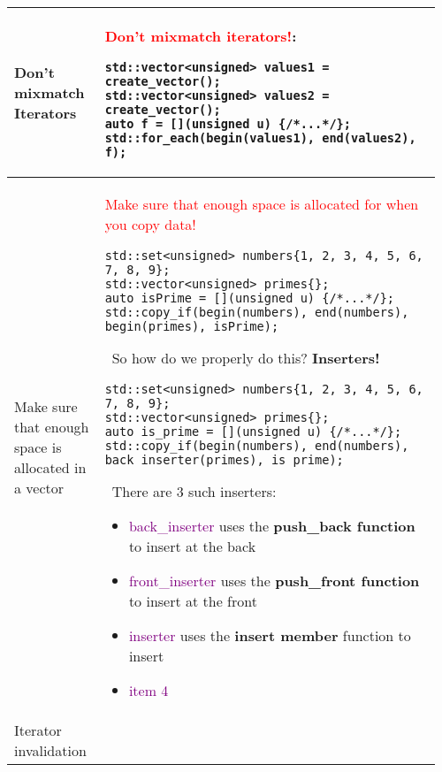 \documentclass[main.tex,fontsize=8pt,paper=a4,paper=portrait,DIV=calc,]{scrartcl}
\begin{document}
\begin{table}[ht!]
\begin{tabular}{|m{0.2\linewidth}|m{0.755\linewidth}|}
\hline
Don't mixmatch Iterators & 
\textcolor{red}{Don't mixmatch iterators!}:\newline
\begin{lstlisting}
std::vector<unsigned> values1 = create_vector();
std::vector<unsigned> values2 = create_vector();
auto f = [](unsigned u) {/*...*/};
std::for_each(begin(values1), end(values2), f);
\end{lstlisting}
\\
\hline
Make sure that enough space is allocated in a vector & 
\textcolor{red}{Make sure that enough space is allocated for when you copy data!}\newline
\begin{lstlisting}
std::set<unsigned> numbers{1, 2, 3, 4, 5, 6, 7, 8, 9};
std::vector<unsigned> primes{};
auto isPrime = [](unsigned u) {/*...*/};
std::copy_if(begin(numbers), end(numbers), begin(primes), isPrime);
\end{lstlisting}
\, \newline
So how do we properly do this? \textbf{Inserters!}\newline
\begin{lstlisting}
std::set<unsigned> numbers{1, 2, 3, 4, 5, 6, 7, 8, 9};
std::vector<unsigned> primes{};
auto is_prime = [](unsigned u) {/*...*/};
std::copy_if(begin(numbers), end(numbers), back_inserter(primes), is_prime);
\end{lstlisting}
\, \newline
There are 3 such inserters:\newline
\begin{itemize}
\item \textcolor{purple}{back\_inserter}\newline
  uses the \textbf{push\_back function} to insert at the back
\item \textcolor{purple}{front\_inserter}\newline
  uses the \textbf{push\_front function} to insert at the front
\item \textcolor{purple}{inserter}\newline
  uses the \textbf{insert member} function to insert
\item \textcolor{purple}{item 4}
\vspace{-3mm}
\end{itemize} \\
\hline
Iterator invalidation & 

\end{tabular}
\end{table}
\end{document}
